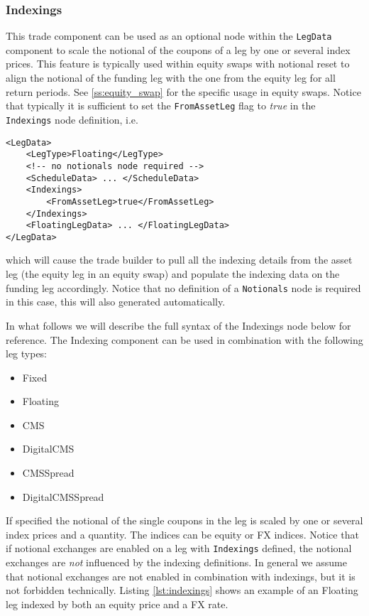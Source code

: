 \subsubsection{Indexings}
\label{ss:indexings}

This trade component can be used as an optional node within the \lstinline!LegData! component to scale the notional of the coupons
of a leg by one or several index prices. This feature is typically used within equity swaps with notional reset to align
the notional of the funding leg with the one from the equity leg for all return periods. See \ref{ss:equity_swap} for
the specific usage in equity swaps. Notice that typically it is sufficient to set the \lstinline!FromAssetLeg! flag to \emph{true} in the
\verb+Indexings+ node definition, i.e.

\begin{verbatim}
<LegData>
    <LegType>Floating</LegType>
    <!-- no notionals node required -->
    <ScheduleData> ... </ScheduleData>
    <Indexings>
        <FromAssetLeg>true</FromAssetLeg>
    </Indexings>
    <FloatingLegData> ... </FloatingLegData>
</LegData>
\end{verbatim}

which will cause the trade builder to pull all the indexing details from the asset leg (the equity leg in an equity
swap) and populate the indexing data on the funding leg accordingly. Notice that no definition of a \verb+Notionals+
node is required in this case, this will also generated automatically.

In what follows we will describe the full syntax of the Indexings node below for reference. The Indexing component can
be used in combination with the following leg types:

\begin{itemize}
\item Fixed
\item Floating
\item CMS
\item DigitalCMS
\item CMSSpread
\item DigitalCMSSpread
\end{itemize}

If specified the notional of the single coupons in the leg is scaled by one or several index prices and a quantity. The
indices can be equity or FX indices. Notice that if notional exchanges are enabled on a leg with \lstinline!Indexings! defined, the
notional exchanges are {\em not} influenced by the indexing definitions. In general we assume that notional exchanges
are not enabled in combination with indexings, but it is not forbidden technically. Listing \ref{lst:indexings} shows an
example of an Floating leg indexed by both an equity price and a FX rate.

